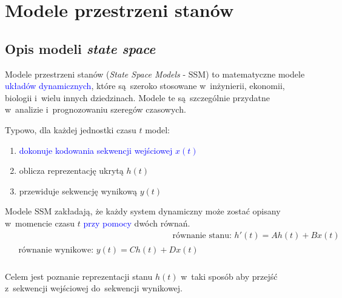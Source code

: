 \documentclass[data-science]{agh-wi} %
\begin{document}

\section{Modele przestrzeni stanów}
\subsection{Opis modeli \textit{state space}}
Modele przestrzeni stanów (\textit{State Space Models} - SSM) to matematyczne modele \textcolor{blue}{układów dynamicznych}, które są~szeroko stosowane w~inżynierii, ekonomii, biologii i~wielu innych dziedzinach. Modele te są~szczególnie przydatne w~analizie i~prognozowaniu szeregów czasowych.

\noindent Typowo, dla każdej jednostki czasu $t$ model:
\begin{enumerate}
    \item \textcolor{blue}{dokonuje kodowania sekwencji wejściowej $x(t)$}
    \item oblicza reprezentację ukrytą $h(t)$
    \item przewiduje sekwencję wynikową $y(t)$
\end{enumerate}

Modele SSM zakładają, że każdy system dynamiczny może zostać opisany w~momencie czasu $t$ \textcolor{blue}{przy pomocy} dwóch równań.
\begin{align}
     & \text{równanie stanu: } h'(t) = Ah(t) + Bx(t) \label{equ:rownanie_stanu} \\
    \begin{split}
        &\text{równanie wynikowe: } y(t) = Ch(t) + Dx(t) \label{equ:rownanie_wynikowe} \\
    \end{split}
\end{align}

Celem jest poznanie reprezentacji stanu $h(t)$ w~taki sposób aby przejść z~sekwencji wejściowej do~sekwencji wynikowej.
\end{document}
